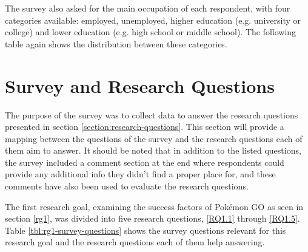 
The survey also asked for the main occupation of each respondent, with four categories available: employed, unemployed, higher education (e.g. university or college) and lower education (e.g. high school or middle school). The following table again shows the distribution between these categories. 


\section{Survey and Research Questions}

The purpose of the survey was to collect data to answer the research questions presented in section \ref{section:research-questions}. This section will provide a mapping between the questions of the survey and the research questions each of them aim to answer. It should be noted that in addition to the listed questions, the survey included a comment section at the end where respondents could provide any additional info they didn't find a proper place for, and these comments have also been used to evaluate the research questions.


The first research goal, examining the success factors of Pokémon GO as seen in section \ref{rg1}, was divided into five research questions, \ref{RQ1.1} through \ref{RQ1.5}. Table \ref{tbl:rg1-survey-questions} shows the survey questions relevant for this research goal and the research questions each of them help answering.

